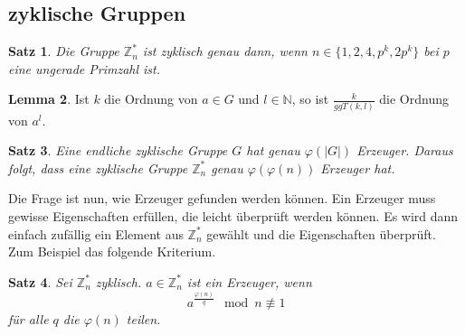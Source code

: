 \documentclass[a4paper, 12pt]{article}
\theoremstyle{plain}
\newtheorem{theorem}{Satz}[subsection] %
\theoremstyle{definition}
\theoremstyle{lemma}
\newtheorem{lemma}[theorem]{Lemma}
\theoremstyle{remark}
\theoremstyle{corollary}
\theoremstyle{example}
\begin{document}
	\subsection{zyklische Gruppen}
	\begin{theorem}
		Die Gruppe $\mathbb{Z}_n^*$ ist zyklisch genau dann, wenn $n \in \{1,2,4,p^k,2p^k\}$ bei $p$ eine ungerade Primzahl ist.
	\end{theorem}
	\begin{lemma}
		Ist $k$ die Ordnung von $a \in G$ und $l\in \mathbb{N}$, so ist $\frac{k}{ggT(k,l)}$ die Ordnung von $a^l$.
	\end{lemma}
	\begin{theorem}
		Eine endliche zyklische Gruppe $G$ hat genau $\varphi(\left|G\right|)$ Erzeuger. Daraus folgt, dass eine zyklische Gruppe $\mathbb{Z}_n^*$ genau $\varphi(\varphi(n))$ Erzeuger hat.
	\end{theorem}
	Die Frage ist nun, wie Erzeuger gefunden werden können. Ein Erzeuger muss gewisse Eigenschaften erfüllen, die leicht überprüft werden können. Es wird dann einfach zufällig ein Element aus $\mathbb{Z}_n^*$ gewählt und die Eigenschaften überprüft. Zum Beispiel das folgende Kriterium.
	\begin{theorem}
		Sei $\mathbb{Z}_n^*$ zyklisch. $a \in \mathbb{Z}_n^*$ ist ein Erzeuger, wenn \[a^{\frac{\varphi(n)}{q}} \mod n \not\equiv 1\] für alle $q$ die $\varphi(n)$ teilen.
	\end{theorem}
\end{document}
